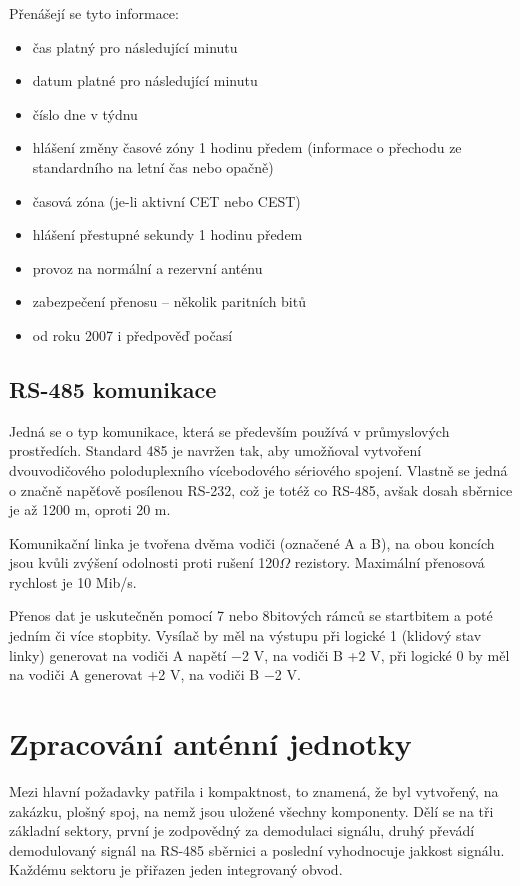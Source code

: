     Přenášejí se tyto informace:

    \begin{itemize}
        \item čas platný pro následující minutu
        \item datum platné pro následující minutu
        \item číslo dne v týdnu
        \item hlášení změny časové zóny 1 hodinu předem (informace o přechodu ze standardního na letní čas nebo opačně)
        \item časová zóna (je-li aktivní CET nebo CEST)
        \item hlášení přestupné sekundy 1 hodinu předem
        \item provoz na normální a rezervní anténu
        \item zabezpečení přenosu – několik paritních bitů
        \item od roku 2007 i předpověď počasí
    \end{itemize}

\subsection{RS-485 komunikace}
    Jedná se o typ komunikace, která se především používá v průmyslových prostředích.
    Standard 485 je navržen tak, aby umožňoval vytvoření dvouvodičového poloduplexního
    vícebodového sériového spojení. Vlastně se jedná o značně napěťově posílenou RS-232, což je
    totéž co RS-485, avšak dosah sběrnice je až 1200 m, oproti 20 m.

    Komunikační linka je tvořena dvěma vodiči (označené A a B), na obou koncích jsou kvůli
    zvýšení odolnosti proti rušení 120$\Omega$ rezistory. Maximální přenosová rychlost je
    10 Mib/s.

    Přenos dat je uskutečněn pomocí 7 nebo 8bitových rámců se startbitem a poté jedním či
    více stopbity. Vysílač by měl na výstupu při logické 1 (klidový stav linky) generovat na vodiči A napětí −2 V, na vodiči B +2 V, při logické 0 by měl na vodiči A generovat +2 V, na vodiči B −2 V.

\section{Zpracování anténní jednotky}
Mezi hlavní požadavky patřila i kompaktnost, to znamená, že byl vytvořený, na zakázku,
plošný spoj, na nemž jsou uložené všechny komponenty. Dělí se na tři základní sektory,
první je zodpovědný za demodulaci signálu, druhý převádí demodulovaný signál na RS-485
sběrnici a poslední vyhodnocuje jakkost signálu. Každému sektoru je přiřazen jeden
integrovaný obvod.
